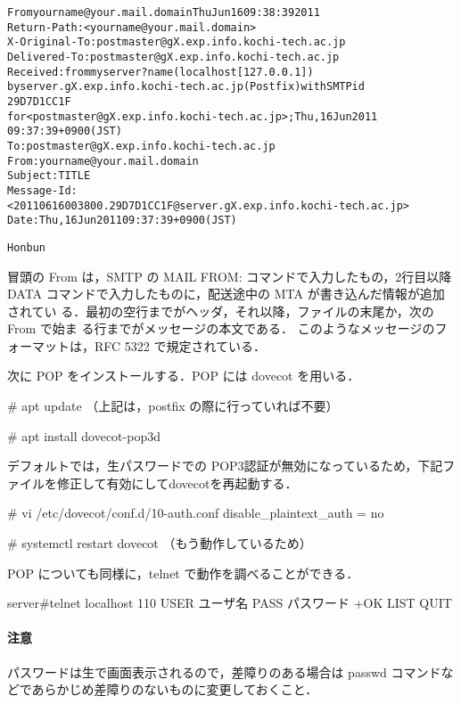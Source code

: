 \begin{center}
\begin{breakbox}
\begin{alltt}
From yourname@your.mail.domain  Thu Jun 16 09:38:39 2011
Return-Path: <yourname@your.mail.domain>
X-Original-To: postmaster@gX.exp.info.kochi-tech.ac.jp
Delivered-To: postmaster@gX.exp.info.kochi-tech.ac.jp
Received: from myserver?name (localhost [127.0.0.1])
        by server.gX.exp.info.kochi-tech.ac.jp (Postfix) with SMTP id
	29D7D1CC1F
        for <postmaster@gX.exp.info.kochi-tech.ac.jp>; Thu, 16 Jun 2011
	09:37:39 +0900 (JST)
To: postmaster@gX.exp.info.kochi-tech.ac.jp
From: yourname@your.mail.domain
Subject: TITLE
Message-Id:
<20110616003800.29D7D1CC1F@server.gX.exp.info.kochi-tech.ac.jp>
Date: Thu, 16 Jun 2011 09:37:39 +0900 (JST)

Honbun
\end{alltt}
\end{breakbox}
\end{center}

冒頭の From は，SMTP の MAIL FROM: コマンドで入力したもの，2行目以降DATA 
コマンドで入力したものに，配送途中の MTA が書き込んだ情報が追加されてい
る．最初の空行までがヘッダ，それ以降，ファイルの末尾か，次の From で始ま
る行までがメッセージの本文である．
このようなメッセージのフォーマットは，RFC 5322 で規定されている．

次に POP をインストールする．POP には dovecot を用いる．

\begin{cli}
# apt update
（上記は，postfix の際に行っていれば不要）

# apt install dovecot-pop3d
\end{cli}

デフォルトでは，生パスワードでの POP3認証が無効になっているため，下記ファイルを修正して有効にしてdovecotを再起動する．

\begin{cli}
# vi /etc/dovecot/conf.d/10-auth.conf
disable_plaintext_auth = no

# systemctl restart dovecot （もう動作しているため）
\end{cli}

POP についても同様に，telnet で動作を調べることができる．
\begin{cli}
server#telnet localhost 110
USER ユーザ名
PASS パスワード
+OK
LIST
QUIT
\end{cli}
\paragraph{注意} パスワードは生で画面表示されるので，差障りのある場合は
passwd コマンドなどであらかじめ差障りのないものに変更しておくこと．

